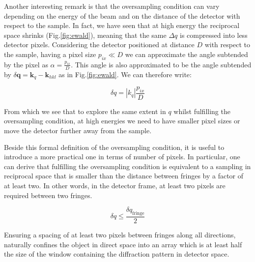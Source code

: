 Another interesting remark is that the oversampling condition can vary depending on the energy of the beam and on the 
distance of the detector with respect to the sample. 
In fact, we have seen that at high energy the reciprocal space shrinks (Fig.\ref{fig:ewald}), meaning that the same $\Delta q$ is compressed 
into less detector pixels. Considering the detector positioned at distance $D$ with respect to the sample, having a pixel 
size $p_{ix} \ll D$ we can approximate the angle subtended by the pixel as $\alpha = \frac{p_{ix}}{D}$. This angle 
is also approximated to be the angle subtended by $\delta \mathbf{q} = \mathbf{k}_{q} - \mathbf{k}_{hkl} $ as in Fig.\ref{fig:ewald}. 
We can therefore write: 

\begin{equation}
    \delta q = |k_{q}|\frac{p_{ix}}{D} 
\end{equation}

From which we see that to explore the same extent in $q$ whilst fulfilling the oversampling condition, at high energies 
we need to have smaller pixel sizes or move the detector further away from the sample. 

Beside this formal definition of the oversampling condition, it is useful to introduce a more practical one in terms of 
number of pixels. In particular, one can derive that fulfilling the oversampling condition is equivalent to a sampling 
in reciprocal space that is smaller than the distance between fringes by a factor of at least two. In other words, 
in the detector frame, at least two pixels are required between two fringes. 

\begin{equation}
    \delta q \leq \frac{\delta q_{\text{fringe}}}{2}
\end{equation}

Ensuring a spacing of at least two pixels between fringes along all directions, naturally confines the 
object in direct space into an array which is at least half the size of the window containing 
the diffraction pattern in detector space. 

